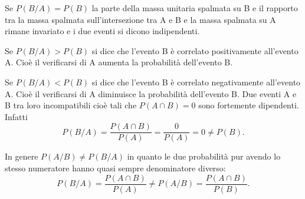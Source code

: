 Se $P(B/A)=P(B)$ la parte della massa unitaria spalmata su B e il rapporto tra la massa spalmata sull'intersezione tra A e B e la massa spalmata su A rimane invariato e i due eventi si dicono indipendenti.

Se $P(B/A)>P(B)$ si dice che l'evento B è correlato positivamente all'evento A. Cioè il verificarsi di A aumenta la probabilità dell'evento B.

Se $P(B/A)<P(B)$ si dice che l'evento B è correlato negativamente all'evento A. Cioè il verificarsi di A diminuisce la probabilità dell'evento B.
\osservazione Due eventi A e B tra loro incompatibili cioè tali che $P(A\cap B)=0$ sono fortemente dipendenti. Infatti 
\[P(B/A)=\frac{P(A\cap B)}{P(A)}=\frac 0{P(A)}=0\neq P(B).\]

In genere $ P(A/B)\neq P(B/A) $ in quanto le due probabilità pur avendo lo stesso numeratore hanno quasi sempre denominatore diverso: 
\[P(B/A)=\frac{P(A\cap B)}{P(A)}\neq P(A/B)=\frac{P(A\cap B)}{P(B)}.\]

